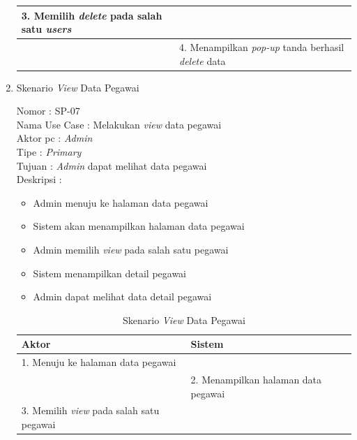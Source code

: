 \begin{enumerate}
\begin{table}
\begin{tabular}{ | l | p{65mm} |}
		\hline
		
		3. Memilih \textit{delete} pada salah satu \textit{users} & \\
		
		\hline
		
		& 4.	Menampilkan \textit{pop-up} tanda berhasil \textit{delete} data \\
		
		\hline
		
	\end{tabular}
\end{table}

\item Skenario \textit{View} Data Pegawai

Nomor \kern 3.6pc : SP-07 \\
Nama Use Case : Melakukan \textit{view} data pegawai \\
Aktor  pc : \textit{Admin} \\
Tipe \kern 4.6pc : \textit{Primary} \\
Tujuan \kern 3.6pc : \textit{Admin} dapat melihat data pegawai \\
Deskripsi \kern 2.5pc : 

\begin{itemize}
	\item Admin menuju ke halaman data pegawai
	\item Sistem akan menampilkan halaman data pegawai
	\item Admin memilih \textit{view} pada salah satu pegawai
	\item Sistem menampilkan detail pegawai
	\item Admin dapat melihat data detail pegawai
	
\end{itemize}

\begin{table}
	\caption{Skenario \textit{View} Data Pegawai}
	\centering
	\begin{tabular}{ | l | p{55mm} |}
		\hline 
		\textbf{Aktor} & \textbf{Sistem} \\
		\hline
		
		1.	Menuju ke halaman data pegawai &  \\
		
		\hline
		
		&  2.	Menampilkan halaman data pegawai \\
		
		\hline
		
		3. Memilih \textit{view} pada salah satu pegawai & \\
		

\end{tabular}
\end{table}
\end{enumerate}
